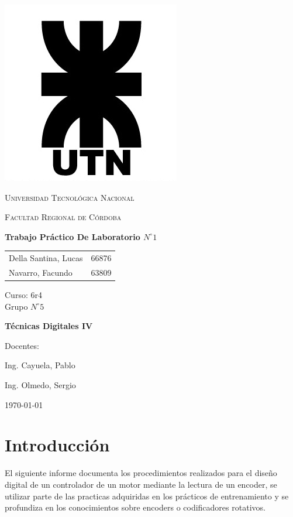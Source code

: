 \documentclass[11pt, a4paper]{article}
\begin{document}
\begin{titlepage}
 \centering
	\includegraphics[scale=0.80]{Imagenes/LOGO.jpg} \par
 	\vspace{1cm}
 	{\scshape\LARGE Universidad Tecnológica Nacional \par}
 	{\scshape\large Facultad Regional de Córdoba \par}
 	\vspace{1cm}
	{\bfseries \Large Trabajo Práctico De Laboratorio $N^{\circ} 1$\par}
 	\vspace{1.5cm}

	\begin{tabular}{ll}
		Della Santina, Lucas	&	66876 \\
		Navarro, Facundo		&	63809 	
	\end{tabular}
	
	\vspace{1cm}
	Curso: 6r4 \\
	Grupo $N^{\circ} 5$
 	\vfill
	{\bfseries \Large Técnicas Digitales IV\par}

	\vspace{1.5cm}
	Docentes: \par
	Ing. Cayuela, Pablo \par
	Ing. Olmedo, Sergio \par

 	\vfill
	{\large \today\par}
\end{titlepage}
	
	
\tableofcontents
\clearpage

\section{Introducción}
	El siguiente informe documenta los procedimientos realizados para el diseño digital de un controlador de un motor mediante la lectura de un encoder, se utilizar parte de las practicas adquiridas en los prácticos de entrenamiento y se profundiza en los conocimientos sobre encoders o codificadores rotativos. 
\end{document}

